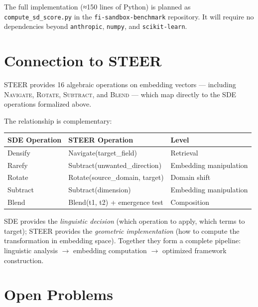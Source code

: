 \documentclass[11pt,a4paper]{article}
\begin{document}
The full implementation (≈150 lines of Python) is planned as
\texttt{compute\_sd\_score.py} in the \texttt{fi-sandbox-benchmark} repository.
It will require no dependencies beyond \texttt{anthropic}, \texttt{numpy},
and \texttt{scikit-learn}.

\section{Connection to STEER}
\label{sec:steer}

STEER \cite{gomes2026steer} provides 16 algebraic operations on embedding
vectors — including \textsc{Navigate}, \textsc{Rotate}, \textsc{Subtract},
and \textsc{Blend} — which map directly to the SDE operations formalized above.

The relationship is complementary:

\begin{center}
\begin{tabular}{lll}
\toprule
\textbf{SDE Operation} & \textbf{STEER Operation} & \textbf{Level} \\
\midrule
Densify   & Navigate(target\_field)          & Retrieval \\
Rarefy    & Subtract(unwanted\_direction)    & Embedding manipulation \\
Rotate    & Rotate(source\_domain, target)   & Domain shift \\
Subtract  & Subtract(dimension)              & Embedding manipulation \\
Blend     & Blend(t1, t2) + emergence test   & Composition \\
\bottomrule
\end{tabular}
\end{center}

SDE provides the \textit{linguistic decision} (which operation to apply, which
terms to target); STEER provides the \textit{geometric implementation} (how
to compute the transformation in embedding space). Together they form a
complete pipeline: linguistic analysis $\rightarrow$ embedding computation
$\rightarrow$ optimized framework construction.

\section{Open Problems}
\label{sec:open}
\end{document}

